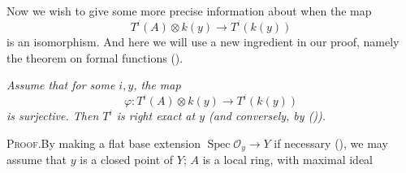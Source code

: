 {\medskip
Now we wish to give some more precise information about when the map
\[
 T^i(A)\otimes k(y)\to T^i(k(y))
\]
is an isomorphism. And here we will use a new ingredient in our proof, namely the theorem on formal functions ().

 \emph{Assume that for some $i,y$, the map}
\[
 \varphi\colon T^i(A)\otimes k(y)\to T^i(k(y))
\]
\noindent\emph{is surjective. Then $T^i$ is right exact at $y$ (and conversely, by ()).}

\par\smallskip\noindent\textsc{Proof.}\enspace By making a flat base extension $\operatorname{Spec}\mathcal O_y\to Y$ if necessary (), we may assume that $y$ is a closed point of $Y$; $A$ is a local ring, with maximal ideal
}
